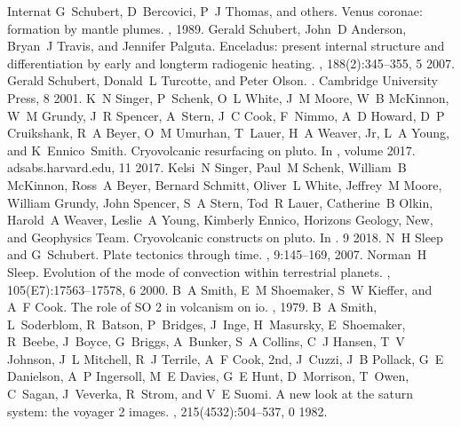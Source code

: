 \documentclass[letterpaper,10pt,english]{jupyterBook}
\begin{document}
\begin{sphinxthebibliography}{Internat}
\sphinxAtStartPar
G Schubert, D Bercovici, P J Thomas, and others. Venus coronae: formation by mantle plumes. , 1989.
\sphinxAtStartPar
Gerald Schubert, John D Anderson, Bryan J Travis, and Jennifer Palguta. Enceladus: present internal structure and differentiation by early and long\sphinxhyphen{}term radiogenic heating. , 188(2):345–355, 5 2007.
\sphinxAtStartPar
Gerald Schubert, Donald L Turcotte, and Peter Olson. . Cambridge University Press, 8 2001.
\sphinxAtStartPar
K N Singer, P Schenk, O L White, J M Moore, W B McKinnon, W M Grundy, J R Spencer, A Stern, J C Cook, F Nimmo, A D Howard, D P Cruikshank, R A Beyer, O M Umurhan, T Lauer, H A Weaver, Jr, L A Young, and K Ennico Smith. Cryovolcanic resurfacing on pluto. In , volume 2017. adsabs.harvard.edu, 11 2017.
\sphinxAtStartPar
Kelsi N Singer, Paul M Schenk, William B McKinnon, Ross A Beyer, Bernard Schmitt, Oliver L White, Jeffrey M Moore, William Grundy, John Spencer, S A Stern, Tod R Lauer, Catherine B Olkin, Harold A Weaver, Leslie A Young, Kimberly Ennico, Horizons Geology, New, and Geophysics Team. Cryovolcanic constructs on pluto. In . 9 2018.
\sphinxAtStartPar
N H Sleep and G Schubert. Plate tectonics through time. , 9:145–169, 2007.
\sphinxAtStartPar
Norman H Sleep. Evolution of the mode of convection within terrestrial planets. , 105(E7):17563–17578, 6 2000.
\sphinxAtStartPar
B A Smith, E M Shoemaker, S W Kieffer, and A F Cook. The role of SO 2 in volcanism on io. , 1979.
\sphinxAtStartPar
B A Smith, L Soderblom, R Batson, P Bridges, J Inge, H Masursky, E Shoemaker, R Beebe, J Boyce, G Briggs, A Bunker, S A Collins, C J Hansen, T V Johnson, J L Mitchell, R J Terrile, A F Cook, 2nd, J Cuzzi, J B Pollack, G E Danielson, A P Ingersoll, M E Davies, G E Hunt, D Morrison, T Owen, C Sagan, J Veverka, R Strom, and V E Suomi. A new look at the saturn system: the voyager 2 images. , 215(4532):504–537, 0 1982.

\end{sphinxthebibliography}
\end{document}
